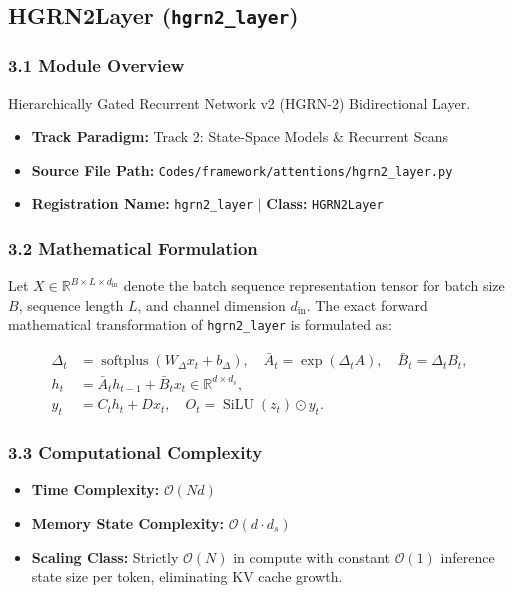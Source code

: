 \subsection{HGRN2Layer (\texttt{hgrn2\_layer})}
\label{sec:app_module_hgrn2_layer}

\subsubsection*{3.1 Module Overview}
Hierarchically Gated Recurrent Network v2 (HGRN-2) Bidirectional Layer.
\begin{itemize}
    \item \textbf{Track Paradigm:} Track 2: State-Space Models \& Recurrent Scans
    \item \textbf{Source File Path:} \texttt{Codes/framework/attentions/hgrn2\_layer.py}
    \item \textbf{Registration Name:} \texttt{hgrn2\_layer} $\mid$ \textbf{Class:} \texttt{HGRN2Layer}
\end{itemize}

\subsubsection*{3.2 Mathematical Formulation}
Let $X \in \mathbb{R}^{B \times L \times d_{\text{in}}}$ denote the batch sequence representation tensor for batch size $B$, sequence length $L$, and channel dimension $d_{\text{in}}$. The exact forward mathematical transformation of \texttt{hgrn2\_layer} is formulated as:

\begin{align}
\Delta_t &= \operatorname{softplus}(W_\Delta x_t + b_\Delta), \quad \bar{A}_t = \exp(\Delta_t A), \quad \bar{B}_t = \Delta_t B_t, \\
h_t &= \bar{A}_t h_{t-1} + \bar{B}_t x_t \in \mathbb{R}^{d \times d_s}, \\
y_t &= C_t h_t + D x_t, \quad O_t = \operatorname{SiLU}(z_t) \odot y_t.
\end{align}


\subsubsection*{3.3 Computational Complexity}
\begin{itemize}
    \item \textbf{Time Complexity:} $\mathcal{O}(N d)$
    \item \textbf{Memory State Complexity:} $\mathcal{O}(d \cdot d_s)$
    \item \textbf{Scaling Class:} Strictly $\mathcal{O}(N)$ in compute with constant $\mathcal{O}(1)$ inference state size per token, eliminating KV cache growth.
\end{itemize}

